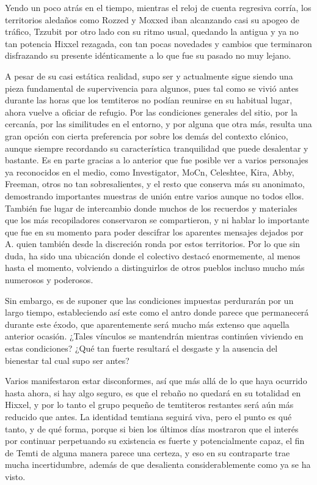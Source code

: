 \documentclass[
  spanish,
]{book}
\begin{document}
Yendo un poco atrás en el tiempo, mientras el reloj de cuenta regresiva corría, los territorios aledaños como Rozzed y Moxxed iban alcanzando casi su apogeo de tráfico, Tzzubit por otro lado con su ritmo usual, quedando la antigua y ya no tan potencia Hixxel rezagada, con tan pocas novedades y cambios que terminaron disfrazando su presente idénticamente a lo que fue su pasado no muy lejano.

A pesar de su casi estática realidad, supo ser y actualmente sigue siendo una pieza fundamental de supervivencia para algunos, pues tal como se vivió antes durante las horas que los temtiteros no podían reunirse en su habitual lugar, ahora vuelve a oficiar de refugio. Por las condiciones generales del sitio, por la cercanía, por las similitudes en el entorno, y por alguna que otra más, resulta una gran opción con cierta preferencia por sobre los demás del contexto clónico, aunque siempre recordando su característica tranquilidad que puede desalentar y bastante. Es en parte gracias a lo anterior que fue posible ver a varios personajes ya reconocidos en el medio, como Investigator, MoCn, Celeshtee, Kira, Abby, Freeman, otros no tan sobresalientes, y el resto que conserva más su anonimato, demostrando importantes muestras de unión entre varios aunque no todos ellos. También fue lugar de intercambio donde muchos de los recuerdos y materiales que los más recopiladores conservaron se compartieron, y ni hablar lo importante que fue en su momento para poder descifrar los aparentes mensajes dejados por A. quien también desde la discreción ronda por estos territorios. Por lo que sin duda, ha sido una ubicación donde el colectivo destacó enormemente, al menos hasta el momento, volviendo a distinguirlos de otros pueblos incluso mucho más numerosos y poderosos.

Sin embargo, es de suponer que las condiciones impuestas perdurarán por un largo tiempo, estableciendo así este como el antro donde parece que permanecerá durante este éxodo, que aparentemente será mucho más extenso que aquella anterior ocasión. ¿Tales vínculos se mantendrán mientras continúen viviendo en estas condiciones? ¿Qué tan fuerte resultará el desgaste y la ausencia del bienestar tal cual supo ser antes?

Varios manifestaron estar disconformes, así que más allá de lo que haya ocurrido hasta ahora, si hay algo seguro, es que el rebaño no quedará en su totalidad en Hixxel, y por lo tanto el grupo pequeño de temtiteros restantes será aún más reducido que antes. La identidad temtiana seguirá viva, pero el punto es qué tanto, y de qué forma, porque si bien los últimos días mostraron que el interés por continuar perpetuando su existencia es fuerte y potencialmente capaz, el fin de Temti de alguna manera parece una certeza, y eso en su contraparte trae mucha incertidumbre, además de que desalienta considerablemente como ya se ha visto.
\end{document}
